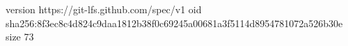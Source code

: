 version https://git-lfs.github.com/spec/v1
oid sha256:8f3ec8c4d824c9daa1812b38f0c69245a00681a3f5114d8954781072a526b30e
size 73
